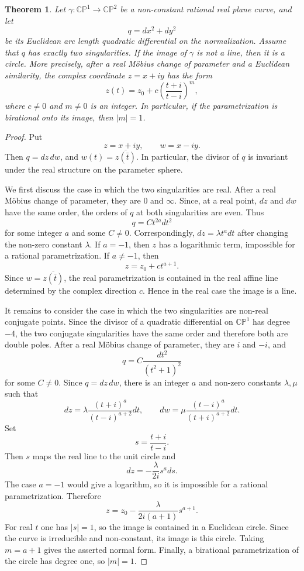 \documentclass[reqno]{amsart}
\newtheorem{theorem}{Theorem}
\newcommand {\bCP} {\mathbb {CP}}
\theoremstyle{definition}
\theoremstyle{remark}
\theoremstyle{definition}
\theoremstyle{definition}
\theoremstyle{definition}
\begin{document}
\begin{theorem}\label{thm:two-singularities-circle}
Let $\gamma:\bCP^{1}\to \bCP^{2}$ be a non-constant rational real plane curve, and let
\[
q=dx^{2}+dy^{2}
\]
be its Euclidean arc length quadratic differential on the normalization. Assume that $q$ has exactly two singularities. If the image of $\gamma$ is not a line, then it is a circle. More precisely, after a real M\"obius change of parameter and a Euclidean similarity, the complex coordinate $z=x+iy$ has the form
\[
z(t)=z_{0}+c\left(\frac{t+i}{t-i}\right)^{m},
\]
where $c\neq 0$ and $m\neq 0$ is an integer. In particular, if the parametrization is birational onto its image, then $|m|=1$.
\end{theorem}

\begin{proof}
Put
\[
z=x+iy,\qquad w=x-iy .
\]
Then $q=dz\,dw$, and $w(t)=\overline{z(\bar t)}$. In particular, the divisor of $q$ is invariant under the real structure on the parameter sphere.

We first discuss the case in which the two singularities are real. After a real M\"obius change of parameter, they are $0$ and $\infty$. Since, at a real point, $dz$ and $dw$ have the same order, the orders of $q$ at both singularities are even. Thus
\[
q=Ct^{2a}dt^{2}
\]
for some integer $a$ and some $C\neq0$. Correspondingly, $dz=\lambda t^{a}dt$ after changing the non-zero constant $\lambda$. If $a=-1$, then $z$ has a logarithmic term, impossible for a rational parametrization. If $a\neq -1$, then
\[
z=z_{0}+ct^{a+1}.
\]
Since $w=\overline{z(\bar t)}$, the real parametrization is contained in the real affine line determined by the complex direction $c$. Hence in the real case the image is a line.

It remains to consider the case in which the two singularities are non-real conjugate points. Since the divisor of a quadratic differential on $\bCP^1$ has degree $-4$, the two conjugate singularities have the same order and therefore both are double poles. After a real M\"obius change of parameter, they are $i$ and $-i$, and
\[
q=C\frac{dt^{2}}{(t^{2}+1)^{2}}
\]
for some $C\neq0$. Since $q=dz\,dw$, there is an integer $a$ and non-zero constants $\lambda,\mu$ such that
\[
dz=\lambda\frac{(t+i)^{a}}{(t-i)^{a+2}}dt,\qquad
 dw=\mu\frac{(t-i)^{a}}{(t+i)^{a+2}}dt .
\]
Set
\[
s=\frac{t+i}{t-i}.
\]
Then $s$ maps the real line to the unit circle and
\[
dz=-\frac{\lambda}{2i}s^{a}ds .
\]
The case $a=-1$ would give a logarithm, so it is impossible for a rational parametrization. Therefore
\[
z=z_{0}-\frac{\lambda}{2i(a+1)}s^{a+1}.
\]
For real $t$ one has $|s|=1$, so the image is contained in a Euclidean circle. Since the curve is irreducible and non-constant, its image is this circle. Taking $m=a+1$ gives the asserted normal form. Finally, a birational parametrization of the circle has degree one, so $|m|=1$.
\end{proof}
\end{document}
